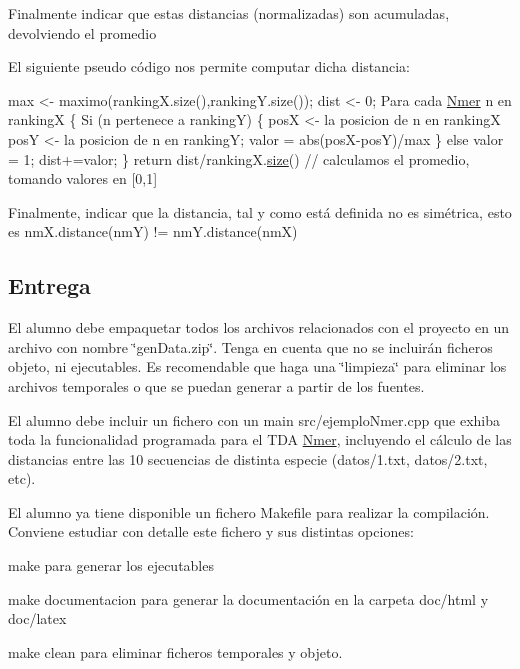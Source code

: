Finalmente indicar que estas distancias (normalizadas) son acumuladas, devolviendo el promedio

El siguiente pseudo código nos permite computar dicha distancia\+: 
\begin{DoxyCode}
max <- maximo(rankingX.size(),rankingY.size());
dist <- 0;
Para cada \hyperlink{classNmer}{Nmer} n en rankingX \{
  Si (n pertenece a rankingY) \{
    posX <- la posicion de n en rankingX
    posY <- la posicion de n en rankingY;
        valor = abs(posX-posY)/max
  \} \textcolor{keywordflow}{else} valor = 1;
  dist+=valor;
 \} 
\textcolor{keywordflow}{return} dist/rankingX.\hyperlink{classNmer_accdea65838fcd53c48a2d05f6809643f}{size}() \textcolor{comment}{// calculamos el promedio, tomando  valores en [0,1]}
\end{DoxyCode}


Finalmente, indicar que la distancia, tal y como está definida no es simétrica, esto es nm\+X.\+distance(nm\+Y) != nm\+Y.\+distance(nm\+X)\hypertarget{index_entrega}{}\subsection{Entrega}\label{index_entrega}
El alumno debe empaquetar todos los archivos relacionados con el proyecto en un archivo con nombre \char`\"{}gen\+Data.\+zip\char`\"{}. Tenga en cuenta que no se incluirán ficheros objeto, ni ejecutables. Es recomendable que haga una \char`\"{}limpieza\char`\"{} para eliminar los archivos temporales o que se puedan generar a partir de los fuentes.

El alumno debe incluir un fichero con un main {\ttfamily src/ejemplo\+Nmer.\+cpp} que exhiba toda la funcionalidad programada para el T\+DA \hyperlink{classNmer}{Nmer}, incluyendo el cálculo de las distancias entre las 10 secuencias de distinta especie ({\ttfamily datos/1.\+txt, datos/2.\+txt}, etc).

El alumno ya tiene disponible un fichero Makefile para realizar la compilación. Conviene estudiar con detalle este fichero y sus distintas opciones\+:
\begin{DoxyItemize}
\item {\ttfamily make} para generar los ejecutables
\item {\ttfamily make documentacion} para generar la documentación en la carpeta {\ttfamily doc/html} y {\ttfamily doc/latex}
\item {\ttfamily make clean} para eliminar ficheros temporales y objeto.
\end{DoxyItemize}

